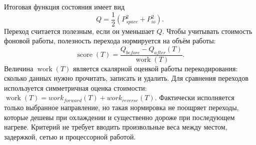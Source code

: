 Итоговая функция состояния имеет вид
\[
    Q = \frac{1}{2}\left(P_{space}^2 + P_{io}^2\right).
\]
Переход считается полезным, если он уменьшает \(Q\). Чтобы учитывать стоимость
фоновой работы, полезность перехода нормируется на объём работы:
\[
    \operatorname{score}(T) =
    \frac{
        Q_{before} - Q_{after}(T)
    }{
        \operatorname{work}(T)
    }.
\]
Величина \(\operatorname{work}(T)\) является скалярной оценкой работы
перекодирования: сколько данных нужно прочитать, записать и удалить. Для
сравнения переходов используется симметричная оценка стоимости:
\(\operatorname{work}(T)=work_{forward}(T)+work_{reverse}(T)\). Фактически
исполняется только выбранное направление, но такая нормировка не поощряет
переходы, которые дешевы при охлаждении и существенно дороже при последующем
нагреве. Критерий не требует вводить произвольные веса между местом, задержкой,
сетью и процессорной работой.

\pagebreak
